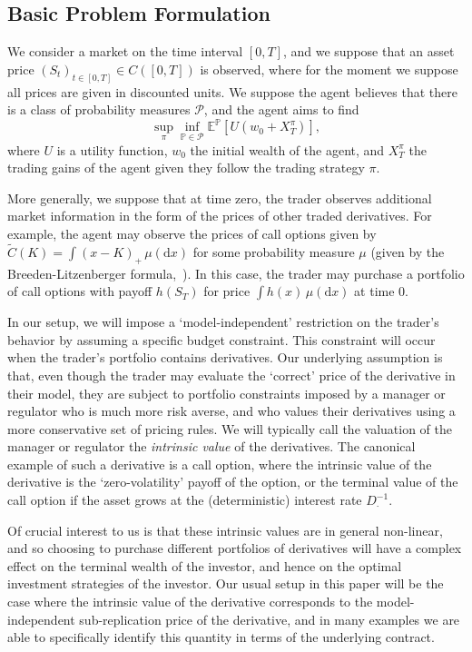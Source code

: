 \documentclass[a4paper]{amsart}
\theoremstyle{definition}
\theoremstyle{remark}
\numberwithin{equation}{section}
\newcommand{\E}{\mathbb{E}}
\renewcommand{\P}{\mathbb{P}}
\newcommand{\dx}{\mathrm{d}x}
\newcommand{\Edot}[2]{\E^{#1}\left[#2\right]}
\newcommand{\Pc}{\mathcal{P}}
\newcommand{\tC}{\tilde{C}} %
\begin{document}
\subsection{Basic Problem Formulation}

We consider a market on the time interval $[0,T]$, and we suppose that an asset price $(S_t)_{t \in [0,T]} \in C([0,T])$ is observed, where for the moment we suppose all prices are given in discounted units. We suppose the agent believes that there is a class of probability measures $\Pc$, and the agent aims to find
\begin{equation}\label{eq:MainProb}
  \sup_{ \pi} \inf_{ \P \in \Pc} \Edot{\P}{U\left(w_0 + X_T^\pi\right)}, 
\end{equation}
where $U$ is a utility function, $w_0$ the initial wealth of the agent, and $X_T^{\pi}$ the trading gains of the agent given they follow the trading strategy $\pi$. 

More generally, we suppose that at time zero, the trader observes additional market information in the form of the prices of other traded derivatives. For example, the agent may observe the prices of call options given by $\tC(K) = \int (x-K)_+ \, \mu(\dx)$ for some probability measure $\mu$ (given by the Breeden-Litzenberger formula,~\cite{breeden_prices_1978}). In this case, the trader may purchase a portfolio of call options with payoff $h(S_T)$ for price $\int h(x) \, \mu(\dx)$ at time 0.

In our setup, we will impose a `model-independent' restriction on the trader's behavior by assuming a specific budget constraint. This constraint will occur when the trader's portfolio contains derivatives. Our underlying assumption is that, even though the trader may evaluate the `correct' price of the derivative in their model, they are subject to portfolio constraints imposed by a manager or regulator who is much more risk averse, and who values their derivatives using a more conservative set of pricing rules. We will typically call the valuation of the manager or regulator the \emph{intrinsic value} of the derivatives. The canonical example of such a derivative is a call option, where the intrinsic value of the derivative is the `zero-volatility' payoff of the option, or the terminal value of the call option if the asset grows at the (deterministic) interest rate $D_{\cdot}^{-1}$.

Of crucial interest to us is that these intrinsic values are in general non-linear, and so choosing to purchase different portfolios of derivatives will have a complex effect on the terminal wealth of the investor, and hence on the optimal investment strategies of the investor. Our usual setup in this paper will be the case where the intrinsic value of the derivative corresponds to the model-independent sub-replication price of the derivative, and in many examples we are able to specifically identify this quantity in terms of the underlying contract.
\end{document}
